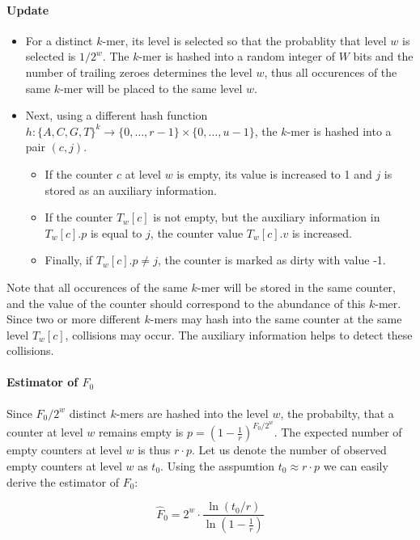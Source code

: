 \paragraph{Update}
\begin{itemize}
\item For a distinct $k$-mer, its level is selected so that the probablity that level $w$ is selected is $1/2^w$. The $k$-mer is hashed
into a random integer of $W$ bits and the number of trailing zeroes determines the level $w$, thus all occurences of the same
$k$-mer will be placed to the same level $w$.

\item Next, using a different hash function $h: \{A, C, G, T\}^k \rightarrow \{ 0, \dots, r-1\} \times \{ 0, \dots, u-1\}$, the $k$-mer is hashed 
into a pair $(c, j)$. 
\begin{itemize}
\item If the counter $c$ at level $w$ is empty, its value is increased to 1 and $j$ is stored as an auxiliary information.
\item If the counter $T_w[c]$ is not empty, but the auxiliary information in $T_w[c].p$ is equal to $j$, the counter value $T_w[c].v$ is increased.
\item Finally, if $T_w[c].p \neq j$, the counter is marked as dirty with value -1.
\end{itemize}
\end{itemize}
Note that all occurences of the same $k$-mer will be stored in the same counter, and the value of the counter should correspond to the abundance of this $k$-mer.
Since two or more different $k$-mers may hash into the same counter at the same level $T_w[c]$, collisions may occur. The auxiliary information
helps to detect these collisions.


\paragraph{Estimator of $F_0$}
Since $F_0 / 2^w$ distinct $k$-mers are hashed into the level $w$, the probabilty, that a counter at level $w$ remains empty
is $p = (1 - \frac{1}{r})^{F_0/2^w}$. The expected number of empty counters at level $w$ is thus $r \cdot p$. Let us denote the
number of observed empty counters at level $w$ as $t_0$. Using the asspumtion $t_0 \approx r \cdot p$ we can easily derive the estimator of $F_0$:

$$ \hat F_0 = 2^w \cdot \frac{\ln(t_0/r)}{\ln\left(1 - \frac{1}{r}\right)} $$

